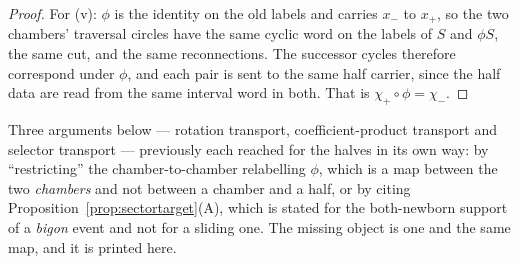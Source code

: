 \begin{proof}
For (v): $\phi$ is the identity on the old labels and carries $x_-$ to $x_+$, so
the two chambers' traversal circles have the same cyclic word on the labels of
$S$ and $\phi S$, the same cut, and the same reconnections. The successor cycles
therefore correspond under $\phi$, and each pair is sent to the same half
carrier, since the half data are read from the same interval word in both. That
is $\chi_+\circ\phi=\chi_-$.
\end{proof}

\begin{remark}\label{rem:chamberhalfwhy}
Three arguments below --- rotation transport, coefficient-product transport and
selector transport --- previously each reached for the halves in its own way: by
``restricting'' the chamber-to-chamber relabelling $\phi$, which is a map
between the two \emph{chambers} and not between a chamber and a half, or by
citing Proposition~\ref{prop:sectortarget}(A), which is stated for the both-newborn support
of a \emph{bigon} event and not for a sliding one. The missing object is one and the
same map, and it is printed here.
\end{remark}

